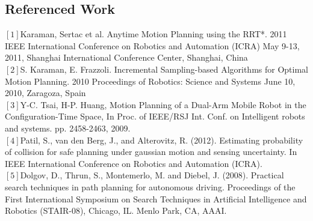 \documentclass[12pt]{article}
\begin{document}
\subsection*{Referenced Work}
            $[1]$Karaman, Sertac et al. Anytime Motion Planning using the RRT*. 2011 IEEE International Conference on Robotics and Automation (ICRA) May 9-13, 2011, Shanghai International Conference Center, Shanghai, China\\
            $[2]$S. Karaman, E. Frazzoli. Incremental Sampling-based Algorithms for Optimal Motion Planning. 2010 Proceedings of Robotics: Science and Systems June 10, 2010, Zaragoza, Spain\\
            $[3]$Y-C. Tsai, H-P. Huang, Motion Planning of a Dual-Arm Mobile Robot in the Configuration-Time Space, In Proc. of IEEE/RSJ Int. Conf. on Intelligent robots and systems. pp. 2458-2463, 2009. \\
            $[4]$Patil, S., van den Berg, J., and Alterovitz, R. (2012). Estimating probability of collision for safe planning under gaussian motion and sensing uncertainty. In IEEE International Conference on Robotics and Automation (ICRA).\\
            $[5]$Dolgov, D., Thrun, S., Montemerlo, M. and Diebel, J. (2008). Practical search techniques in path planning for autonomous driving. Proceedings of the First International Symposium on Search Techniques in Artificial Intelligence and Robotics (STAIR-08), Chicago, IL. Menlo Park, CA, AAAI.\\
\end{document}
